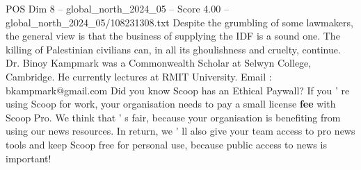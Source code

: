 \begin{textsample}{POS Dim 8 – global\_north\_2024\_05 – Score 4.00 – global\_north\_2024\_05/108231308.txt}
Despite the grumbling of some lawmakers, the general view is that the business of supplying the IDF is a sound one.
The killing of Palestinian civilians can, in all its ghoulishness and cruelty, continue.
Dr.
Binoy Kampmark was a Commonwealth Scholar at Selwyn College, Cambridge.
He currently lectures at RMIT University.
Email : bkampmark@gmail.com Did you know Scoop has an Ethical Paywall?
If you ' re using Scoop for work, your organisation needs to pay a small license \textbf{fee} with Scoop Pro.
We think that ' s fair, because your organisation is benefiting from using our news resources.
In return, we ' ll also give your team access to pro news tools and keep Scoop free for personal use, because public access to news is important!

\end{textsample}
